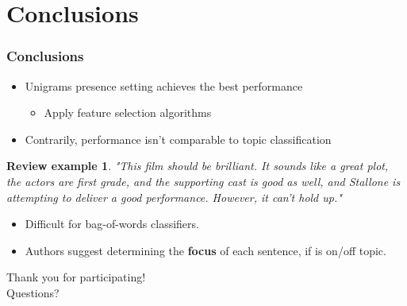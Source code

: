 \documentclass{beamer}
\newtheorem{snt}{Review example}
\begin{document}
\section{Conclusions}
\begin{frame}
	\frametitle{Conclusions}
	\begin{itemize}
	\item Unigrams presence setting achieves the best performance
	\begin{itemize}
		\item Apply feature selection algorithms
	\end{itemize}
	\pause
	\item Contrarily, performance isn't comparable to topic classification 
	\end{itemize}
	\pause

	\begin{snt}
		"This film should be brilliant. It sounds like a great plot, the actors are first grade, and the supporting cast is good as well, and Stallone is attempting to deliver a good performance. However, it can't hold up."
	\end{snt}
	\pause
	
	\begin{itemize}
		\item Difficult for bag-of-words classifiers. \pause
		\item Authors suggest determining the \textbf{focus} of each sentence, if is on/off topic.
	\end{itemize}
\end{frame}

\begin{frame}
	\centering
	\huge
	Thank you for participating! \\
	Questions?
\end{frame}
\end{document}
